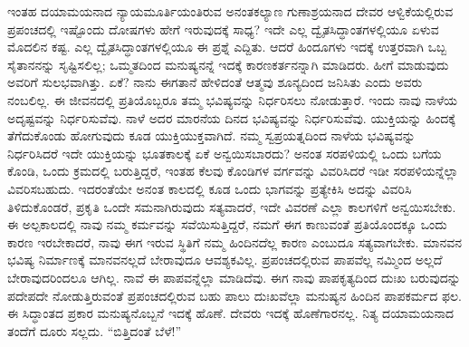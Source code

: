 ಇಂತಹ ದಯಾಮಯನಾದ ನ್ಯಾಯಮೂರ್ತಿಯಂತಿರುವ ಅನಂತಕಲ್ಯಾಣ ಗುಣಾಶ್ರಯನಾದ ದೇವರ ಆಳ್ವಿಕೆಯಲ್ಲಿರುವ ಪ್ರಪಂಚದಲ್ಲಿ ಇಷ್ಟೊಂದು ದೋಷಗಳು ಹೇಗೆ ಇರುವುದಕ್ಕೆ ಸಾಧ್ಯ? ಇದೇ ಎಲ್ಲ ದ್ವೈತಸಿದ್ಧಾಂತಗಳಲ್ಲಿಯೂ ಏಳುವ ಮೊದಲಿನ ಕಷ್ಟ. ಎಲ್ಲ ದ್ವೈತಸಿದ್ಧಾಂತಗಳಲ್ಲಿಯೂ ಈ ಪ್ರಶ್ನೆ ಎದ್ದಿತು. ಆದರೆ ಹಿಂದೂಗಳು ಇದಕ್ಕೆ ಉತ್ತರವಾಗಿ ಒಬ್ಬ ಸೈತಾನನನ್ನು ಸೃಷ್ಟಿಸಲಿಲ್ಲ; ಒಮ್ಮತದಿಂದ ಮನುಷ್ಯನನ್ನೆ ಇದಕ್ಕೆ ಕಾರಣ\break ಕರ್ತನನ್ನಾಗಿ ಮಾಡಿದರು. ಹೀಗೆ ಮಾಡುವುದು ಅವರಿಗೆ ಸುಲಭವಾಗಿತ್ತು. ಏಕೆ? ನಾನು ಈಗತಾನೆ ಹೇಳಿದಂತೆ ಆತ್ಮವು ಶೂನ್ಯದಿಂದ ಜನಿಸಿತು ಎಂದು ಅವರು ನಂಬಲಿಲ್ಲ. ಈ ಜೀವನದಲ್ಲಿ ಪ್ರತಿಯೊಬ್ಬರೂ ತಮ್ಮ ಭವಿಷ್ಯವನ್ನು ನಿರ್ಧರಿಸಲು ನೋಡುತ್ತಾರೆ. ಇಂದು ನಾವು ನಾಳೆಯ ಅದೃಷ್ಟವನ್ನು ನಿರ್ಧರಿಸುವೆವು. ನಾಳೆ ಅದರ ಮಾರನೆಯ ದಿನದ ಭವಿಷ್ಯವನ್ನು ನಿರ್ಧರಿಸುವೆವು. ಯುಕ್ತಿಯನ್ನು ಹಿಂದಕ್ಕೆ ತೆಗೆದುಕೊಂಡು ಹೋಗುವುದು ಕೂಡ ಯುಕ್ತಿಯುಕ್ತವಾಗಿದೆ. ನಮ್ಮ ಸ್ವಪ್ರಯತ್ನದಿಂದ ನಾಳೆಯ ಭವಿಷ್ಯವನ್ನು ನಿರ್ಧರಿಸಿದರೆ ಇದೇ ಯುಕ್ತಿಯನ್ನು ಭೂತಕಾಲಕ್ಕೆ ಏಕೆ ಅನ್ವಯಿಸಬಾರದು? ಅನಂತ ಸರಪಳಿಯಲ್ಲಿ ಒಂದು ಬಗೆಯ ಕೊಂಡಿ, ಒಂದು ಕ್ರಮದಲ್ಲಿ ಬರುತ್ತಿದ್ದರೆ, ಇಂತಹ ಕೆಲವು ಕೊಂಡಿಗಳ ವರ್ಗವನ್ನು ವಿವರಿಸಿದರೆ ಇಡೀ ಸರಪಳಿಯನ್ನೆಲ್ಲಾ ವಿವರಿಸಬಹುದು. ಇದರಂತೆಯೇ ಅನಂತ ಕಾಲದಲ್ಲಿ ಕೂಡ ಒಂದು ಭಾಗವನ್ನು ಪ್ರತ್ಯೇಕಿಸಿ ಅದನ್ನು ವಿವರಿಸಿ ತಿಳಿದುಕೊಂಡರೆ, ಪ್ರಕೃತಿ ಒಂದೇ ಸಮನಾಗಿರುವುದು ಸತ್ಯವಾದರೆ, ಇದೇ ವಿವರಣೆ ಎಲ್ಲಾ ಕಾಲಗಳಿಗೆ ಅನ್ವಯಿಸಬೇಕು. ಈ ಅಲ್ಪಕಾಲದಲ್ಲಿ ನಾವು ನಮ್ಮ ಕರ್ಮವನ್ನು ಸವೆಯಿಸುತ್ತಿದ್ದರೆ, ನಮಗೆ ಈಗ ಕಾಣುವಂತೆ ಪ್ರತಿಯೊಂದಕ್ಕೂ ಒಂದು ಕಾರಣ ಇರಬೇಕಾದರೆ, ನಾವು ಈಗ ಇರುವ ಸ್ಥಿತಿಗೆ ನಮ್ಮ ಹಿಂದಿನದೆಲ್ಲ ಕಾರಣ ಎಂಬುದೂ ಸತ್ಯವಾಗಬೇಕು. ಮಾನವನ ಭವಿಷ್ಯ ನಿರ್ಮಾಣಕ್ಕೆ ಮಾನವನಲ್ಲದೆ ಬೇರಾವುದೂ ಆವಶ್ಯಕವಿಲ್ಲ. ಪ್ರಪಂಚದಲ್ಲಿರುವ ಪಾಪವೆಲ್ಲ ನಮ್ಮಿಂದ ಅಲ್ಲದೆ ಬೇರಾವುದರಿಂದಲೂ ಆಗಿಲ್ಲ. ನಾವೆ ಈ ಪಾಪವನ್ನೆಲ್ಲಾ ಮಾಡಿದೆವು. ಈಗ ನಾವು ಪಾಪಕೃತ್ಯದಿಂದ ದುಃಖ ಬರುವುದನ್ನು ಪದೇಪದೇ ನೋಡುತ್ತಿರುವಂತೆ ಪ್ರಪಂಚದಲ್ಲಿರುವ ಬಹು ಪಾಲು ದುಃಖವೆಲ್ಲಾ ಮನುಷ್ಯನ ಹಿಂದಿನ ಪಾಪಕರ್ಮದ ಫಲ. ಈ ಸಿದ್ಧಾಂತದ ಪ್ರಕಾರ ಮನುಷ್ಯನೊಬ್ಬನೆ ಇದಕ್ಕೆ ಹೊಣೆ. ದೇವರು ಇದಕ್ಕೆ ಹೊಣೆಗಾರನಲ್ಲ. ನಿತ್ಯ ದಯಾಮಯನಾದ ತಂದೆಗೆ ದೂರು ಸಲ್ಲದು. “ಬಿತ್ತಿದಂತೆ ಬೆಳೆ!”

